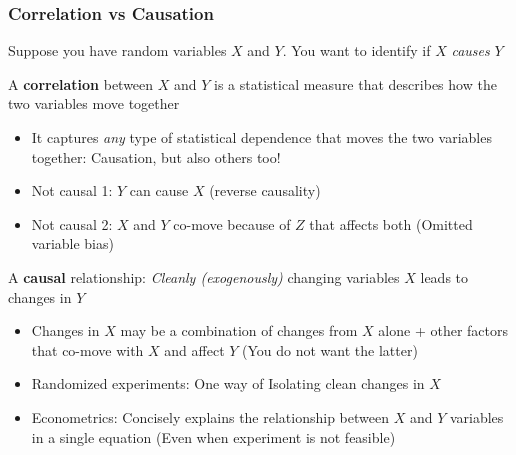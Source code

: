 \documentclass[aspectratio=169]{beamer}
\newenvironment{wideitemize}{\itemize\addtolength{\itemsep}{10pt}}{\enditemize}
\begin{document}
\begin{frame}
\frametitle{Correlation vs Causation}
\begin{wideitemize}
\item Suppose you have random variables $X$ and $Y$. You want to identify if $X$ \textit{causes} $Y$
\item A \textbf{correlation} between $X$ and $Y$ is a statistical measure that describes how the two variables move together
\begin{itemize}
\item It captures \textit{any} type of statistical dependence that moves the two variables together: Causation, but also others too!
\item Not causal 1: $Y$ can cause $X$ (reverse causality)
\item Not causal 2: $X$ and $Y$ co-move because of $Z$ that affects both (Omitted variable bias)
\end{itemize}
\item A \textbf{causal} relationship: \textit{Cleanly (exogenously)} changing variables $X$ leads to changes in $Y$
\begin{itemize}
\item Changes in $X$ may be a combination of changes from $X$ alone + other factors that co-move with $X$ and affect $Y$ (You do not want the latter)
\item Randomized experiments: One way of Isolating clean changes in $X$ 
\item Econometrics: Concisely explains the relationship between $X$ and $Y$ variables in a single equation (Even when experiment is not feasible)
\end{itemize}
 \end{wideitemize}
\end{frame}
\end{document}
